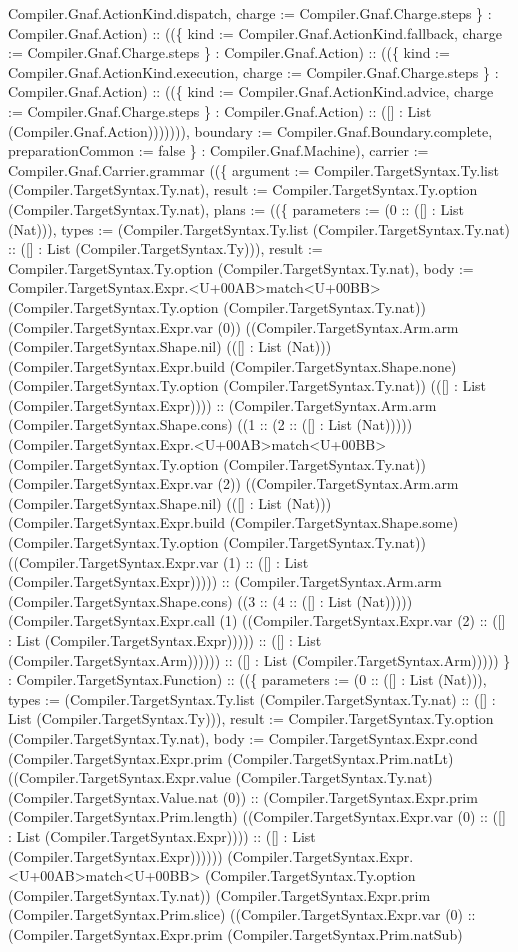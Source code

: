 \documentclass[11pt]{article}
\begin{document}
Compiler.Gnaf.ActionKind.dispatch, charge := Compiler.Gnaf.Charge.steps \} : Compiler.Gnaf.Action) :: ((\{ kind := Compiler.Gnaf.ActionKind.fallback, charge := Compiler.Gnaf.Charge.steps \} : Compiler.Gnaf.Action) :: ((\{ kind := Compiler.Gnaf.ActionKind.execution, charge := Compiler.Gnaf.Charge.steps \} : Compiler.Gnaf.Action) :: ((\{ kind := Compiler.Gnaf.ActionKind.advice, charge := Compiler.Gnaf.Charge.steps \} : Compiler.Gnaf.Action) :: ([] : List (Compiler.Gnaf.Action))))))), boundary := Compiler.Gnaf.Boundary.complete, preparationCommon := false \} : Compiler.Gnaf.Machine), carrier := Compiler.Gnaf.Carrier.grammar ((\{ argument := Compiler.TargetSyntax.Ty.list (Compiler.TargetSyntax.Ty.nat), result := Compiler.TargetSyntax.Ty.option (Compiler.TargetSyntax.Ty.nat), plans := ((\{ parameters := (0 :: ([] : List (Nat))), types := (Compiler.TargetSyntax.Ty.list (Compiler.TargetSyntax.Ty.nat) :: ([] : List (Compiler.TargetSyntax.Ty))), result := Compiler.TargetSyntax.Ty.option (Compiler.TargetSyntax.Ty.nat), body := Compiler.TargetSyntax.Expr.<U+00AB>match<U+00BB> (Compiler.TargetSyntax.Ty.option (Compiler.TargetSyntax.Ty.nat)) (Compiler.TargetSyntax.Expr.var (0)) ((Compiler.TargetSyntax.Arm.arm (Compiler.TargetSyntax.Shape.nil) (([] : List (Nat))) (Compiler.TargetSyntax.Expr.build (Compiler.TargetSyntax.Shape.none) (Compiler.TargetSyntax.Ty.option (Compiler.TargetSyntax.Ty.nat)) (([] : List (Compiler.TargetSyntax.Expr)))) :: (Compiler.TargetSyntax.Arm.arm (Compiler.TargetSyntax.Shape.cons) ((1 :: (2 :: ([] : List (Nat))))) (Compiler.TargetSyntax.Expr.<U+00AB>match<U+00BB> (Compiler.TargetSyntax.Ty.option (Compiler.TargetSyntax.Ty.nat)) (Compiler.TargetSyntax.Expr.var (2)) ((Compiler.TargetSyntax.Arm.arm (Compiler.TargetSyntax.Shape.nil) (([] : List (Nat))) (Compiler.TargetSyntax.Expr.build (Compiler.TargetSyntax.Shape.some) (Compiler.TargetSyntax.Ty.option (Compiler.TargetSyntax.Ty.nat)) ((Compiler.TargetSyntax.Expr.var (1) :: ([] : List (Compiler.TargetSyntax.Expr))))) :: (Compiler.TargetSyntax.Arm.arm (Compiler.TargetSyntax.Shape.cons) ((3 :: (4 :: ([] : List (Nat))))) (Compiler.TargetSyntax.Expr.call (1) ((Compiler.TargetSyntax.Expr.var (2) :: ([] : List (Compiler.TargetSyntax.Expr))))) :: ([] : List (Compiler.TargetSyntax.Arm)))))) :: ([] : List (Compiler.TargetSyntax.Arm))))) \} : Compiler.TargetSyntax.Function) :: ((\{ parameters := (0 :: ([] : List (Nat))), types := (Compiler.TargetSyntax.Ty.list (Compiler.TargetSyntax.Ty.nat) :: ([] : List (Compiler.TargetSyntax.Ty))), result := Compiler.TargetSyntax.Ty.option (Compiler.TargetSyntax.Ty.nat), body := Compiler.TargetSyntax.Expr.cond (Compiler.TargetSyntax.Expr.prim (Compiler.TargetSyntax.Prim.natLt) ((Compiler.TargetSyntax.Expr.value (Compiler.TargetSyntax.Ty.nat) (Compiler.TargetSyntax.Value.nat (0)) :: (Compiler.TargetSyntax.Expr.prim (Compiler.TargetSyntax.Prim.length) ((Compiler.TargetSyntax.Expr.var (0) :: ([] : List (Compiler.TargetSyntax.Expr)))) :: ([] : List (Compiler.TargetSyntax.Expr)))))) (Compiler.TargetSyntax.Expr.<U+00AB>match<U+00BB> (Compiler.TargetSyntax.Ty.option (Compiler.TargetSyntax.Ty.nat)) (Compiler.TargetSyntax.Expr.prim (Compiler.TargetSyntax.Prim.slice) ((Compiler.TargetSyntax.Expr.var (0) :: (Compiler.TargetSyntax.Expr.prim (Compiler.TargetSyntax.Prim.natSub) 
\end{document}
